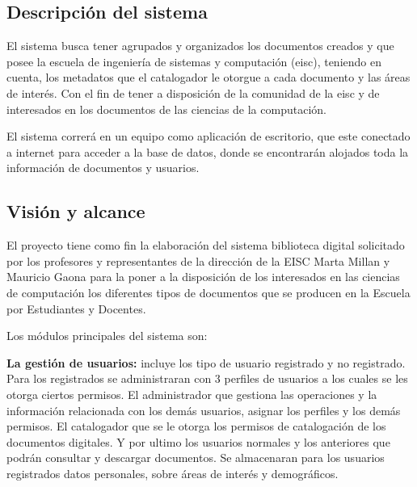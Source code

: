 %
%

\subsection{Descripción del sistema}
        El sistema busca tener agrupados y organizados los documentos creados y que posee la
        escuela de ingeniería de sistemas y computación (eisc), teniendo en cuenta, los metadatos
        que el catalogador le otorgue a cada documento y las áreas de interés. Con el fin de tener
        a disposición de la comunidad de la eisc y de interesados en los documentos de las ciencias
        de la computación.
        
        El sistema correrá en un equipo como aplicación de escritorio, que este conectado a 
        internet para acceder a la base de datos, donde se encontrarán alojados toda la información
        de documentos y usuarios.
        
        \subsection{Visión y alcance}
        El proyecto tiene como fin la elaboración del sistema biblioteca digital solicitado por los
        profesores y representantes de la dirección de la EISC Marta Millan y Mauricio Gaona para
        la poner a la disposición de los interesados en las ciencias de computación los diferentes
        tipos de documentos que se producen en la Escuela por Estudiantes y Docentes.
        
        Los módulos principales del sistema son:
        
        \textbf{La gestión de usuarios:} incluye los tipo de usuario registrado y no registrado.
        Para los registrados se administraran con 3 perfiles de usuarios a los cuales se les otorga
        ciertos permisos. El administrador que gestiona las operaciones y la información 
        relacionada con los demás usuarios, asignar los perfiles y los demás permisos. El 
        catalogador que se le otorga los permisos de catalogación de los documentos digitales. Y
        por ultimo los usuarios normales y los anteriores que podrán consultar y descargar
        documentos. Se almacenaran para los usuarios registrados datos personales, sobre áreas de 
        interés y demográficos.
        
